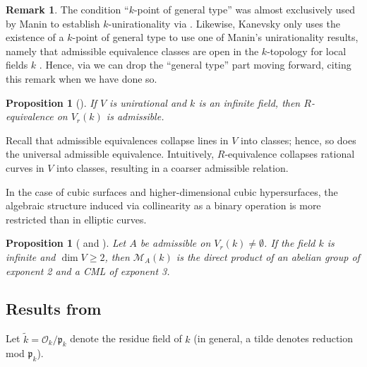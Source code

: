 \documentclass[11pt]{article}
\newtheorem{proposition}[theorem]{Proposition}
\theoremstyle{definition}
\newtheorem{remark}[theorem]{Remark}
\begin{document}
\begin{remark}
\label{rem:no-general-type}
The condition ``$k$-point of general type'' was almost exclusively used by Manin to establish $k$-unirationality via \cite[Thm.12.11]{manin3}. Likewise, Kanevsky only uses the existence of a $k$-point of general type to use one of Manin's unirationality results, namely that admissible equivalence classes are open in the $k$-topology for local fields $k$ \cite[2.7]{dimitrikanevsky}. Hence, via  we can drop the ``general type'' part moving forward, citing this remark when we have done so.
\end{remark}

\begin{proposition}[{\cite[Thm.~14.3]{manin3}}]
\label{thm:r-equiv-admissible}
If $V$ is unirational and $k$ is an infinite field, then $R$-equivalence on $V_r(k)$ is admissible.
\end{proposition}

Recall that admissible equivalences collapse lines in $V$ into classes; hence, so does the universal admissible equivalence. Intuitively, $R$-equivalence collapses rational curves in $V$ into classes, resulting in a coarser admissible relation.


In the case of cubic surfaces and higher-dimensional cubic hypersurfaces, the algebraic structure induced via collinearity as a binary operation is more restricted than in elliptic curves.

\begin{proposition}[{\cite[Cor.~13.3]{manin3}} and ]
\label{thm:structure}
Let $A$ be admissible on $V_r(k) \ne \emptyset$. If the field $k$ is infinite and $\dim V \ge 2$, then $\mathcal{M}_A(k)$ is the direct product of an abelian group of exponent 2 and a CML of exponent 3.
\end{proposition}

\subsection{Results from \cite{swinnertondyer}}
\label{sec:swd-background}

Let $\tilde k = \mathcal{O}_k / \mathfrak{p}_k$ denote the residue field of $k$ (in general, a tilde denotes reduction mod $\mathfrak{p}_k$). 
\end{document}
